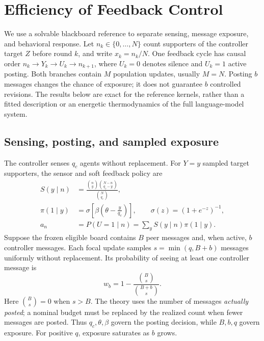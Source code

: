 \section{Efficiency of Feedback Control}
\label{sec:feedback_efficiency}

We use a solvable blackboard reference to separate sensing, message exposure,
and behavioral response. Let $n_k\in\{0,\ldots,N\}$ count supporters of the
controller target $Z$ before round $k$, and write $x_k=n_k/N$. One feedback
cycle has causal order $n_k\to Y_k\to U_k\to n_{k+1}$, where $U_k=0$ denotes
silence and $U_k=1$ active posting. Both branches contain $M$ population
updates, usually $M=N$. Posting $b$ messages changes the chance of exposure;
it does not guarantee $b$ controlled revisions. The results below are exact
for the reference kernels, rather than a fitted description or an energetic
thermodynamics of the full language-model system.

\subsection{Sensing, posting, and sampled exposure}

The controller senses $q_c$ agents without replacement. For $Y=y$ sampled
target supporters, the sensor and soft feedback policy are
\begin{align}
S(y\mid n)&=\frac{\binom{n}{y}\binom{N-n}{q_c-y}}{\binom{N}{q_c}},
\label{eq:sensor_kernel_single_affinity}\\
\pi(1\mid y)&=\sigma\!\left[\beta\left(\theta-\frac{y}{q_c}\right)\right],
\qquad \sigma(z)=(1+e^{-z})^{-1},
\label{eq:feedback_policy_single_affinity}\\
a_n&=P(U=1\mid n)=\sum_y S(y\mid n)\pi(1\mid y).
\label{eq:advocacy_probability_single_affinity}
\end{align}
Suppose the frozen eligible board contains $B$ peer messages and, when active,
$b$ controller messages. Each focal update samples $s=\min(q,B+b)$ messages
uniformly without replacement. Its probability of seeing at least one
controller message is
\begin{equation}
\boxed{w_b=1-\frac{\binom{B}{s}}{\binom{B+b}{s}}.}
\label{eq:blackboard_exposure}
\end{equation}
Here $\binom{B}{s}=0$ when $s>B$. The theory uses the number of messages
\emph{actually posted}; a nominal budget must be replaced by the realized
count when fewer messages are posted. Thus $q_c,\theta,\beta$ govern the
posting decision, while $B,b,q$ govern exposure. For positive $q$, exposure
saturates as $b$ grows.

